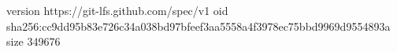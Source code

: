 version https://git-lfs.github.com/spec/v1
oid sha256:cc9dd95b83e726c34a038bd97bfeef3aa5558a4f3978ec75bbd9969d9554893a
size 349676
